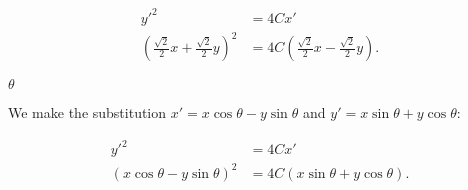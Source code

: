 \documentclass[../gatm_answers.tex]{subfiles}
\begin{document}
\begin{align*}
y'^2&=4Cx' \\
\left(\frac{\sqrt{2}}{2}x+\frac{\sqrt{2}}{2}y\right)^2 &= 4C\left(\frac{\sqrt{2}}{2}x-\frac{\sqrt{2}}{2}y\right).
\end{align*}

\begin{iinner_problem}
\item $\theta$
\end{iinner_problem}

We make the substitution $x'=x \cos \theta - y\sin \theta$ and $y'=x\sin \theta + y\cos \theta$:

\begin{align*}
y'^2&=4Cx' \\
\left(x \cos \theta - y\sin \theta\right)^2 &= 4C\left(x\sin \theta + y\cos \theta\right).
\end{align*}
\end{document}
